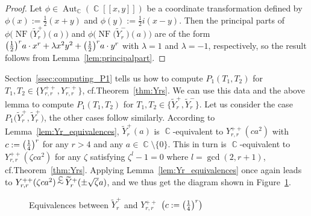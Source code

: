\documentclass[noend]{amsproc}
\theoremstyle{definition}
\let\originalleft\left
\let\originalright\right
\renewcommand{\left}{\mathopen{}\mathclose\bgroup\originalleft}
\renewcommand{\right}{\aftergroup\egroup\originalright}
\newcommand{\tY}{\widetilde{Y}}
\DeclareMathOperator{\csim}{\mathrel{\smash{\overset{\C}{\sim}}}}
\DeclareMathOperator{\C}{\mathbb{C}}
\DeclareMathOperator{\NF}{NF}
\DeclareMathOperator{\Aut}{Aut}
\begin{document}
\begin{proof}
Let $\phi \in \Aut_{\C}(\C[[x,y]])$ be a coordinate transformation defined by
$\phi(x) := \frac{1}{2}(x+y)$ and $\phi(y) := \frac{1}{2}i(x-y)$. Then the
principal parts of $\phi\bigl(\NF\bigl(\tY_r^+\bigr)(a)\bigr)$ and
$\phi\bigl(\NF\bigl(\tY_r^-\bigr)(a)\bigr)$ are of the form
$\left(\frac{1}{2}\right)^r a \cdot x^r + \lambda x^2 y^2
+ \left(\frac{1}{2}\right)^r a \cdot y^r$
with $\lambda = 1$ and $\lambda = -1$, respectively, so the result follows from
Lemma~\ref{lem:principalpart}.
\end{proof}

Section~\ref{ssec:computing_P1} tells us how to compute $P_1(T_1, T_2)$ for
$T_1, T_2 \in \{Y_{r,r}^{++}, Y_{r,r}^{-+}\}$, cf.\@ Theorem~\ref{thm:Yrs}. We
can use this data and the above lemma to compute $P_1(T_1, T_2)$ for
$T_1, T_2 \in \bigl\{\tY_r^+, \tY_r^-\bigr\}$. Let us consider the case
$P_1\bigl(\tY_r^+, \tY_r^+\bigr)$, the other cases follow similarly. According
to Lemma~\ref{lem:Yr_equivalences}, $\tY_r^+(a)$ is $\C$-equivalent to
$Y_{r,r}^{++}(ca^2)$ with $c := \left(\frac{1}{4}\right)^r$ for any $r > 4$ and
any $a \in \C \setminus \{0\}$. This in turn is $\C$-equivalent to
$Y_{r,r}^{++}(\zeta ca^2)$ for any $\zeta$ satisfying $\zeta^l-1 = 0$ where
$l = \gcd(2, r+1)$, cf.\@ Theorem~\ref{thm:Yrs}. Applying
Lemma~\ref{lem:Yr_equivalences} once again leads to
$Y_{r,r}^{++}(\zeta ca^2) \csim \tY_r^+(\pm \sqrt{\zeta}a)$, and we thus get
the diagram shown in Figure~\ref{fig:Yr}.

\begin{figure}
\caption{Equivalences between $\tY_r^+$ and $Y_{r,r}^{++}$%
\quad$\left(c := \left(\frac{1}{4}\right)^r\right)$}%
\label{fig:Yr}
\end{figure}
\end{document}

